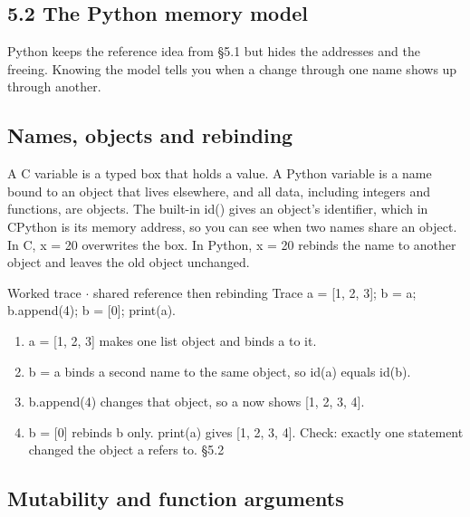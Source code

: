 \documentclass[11pt]{article}
\begin{document}
\begin{keepsection}
\section{5.2 The Python memory model}

Python keeps the reference idea from §5.1 but hides the addresses and the freeing. Knowing the model tells you when a change through one name shows up through another.

\begin{keepsection}
\subsection{Names, objects and rebinding}

A C variable is a typed box that holds a value. A Python variable is a name bound to an object that lives elsewhere, and all data, including integers and functions, are objects. The built-in id() gives an object’s identifier, which in CPython is its memory address, so you can see when two names share an object. In C, x = 20 overwrites the box. In Python, x = 20 rebinds the name to another object and leaves the old object unchanged.

\begin{workedbox}{Worked trace \ensuremath{\cdot} shared reference then rebinding}
Trace a = [1, 2, 3]; b = a; b.append(4); b = [0]; print(a).

\begin{enumerate}
\item a = [1, 2, 3] makes one list object and binds a to it.
\item b = a binds a second name to the same object, so id(a) equals id(b).
\item b.append(4) changes that object, so a now shows [1, 2, 3, 4].
\item b = [0] rebinds b only. print(a) gives [1, 2, 3, 4]. Check: exactly one statement changed the object a refers to. \hfill{\small\color{FAUblue}§5.2}
\end{enumerate}
\end{workedbox}
\end{keepsection}

\begin{keepsection}
\subsection{Mutability and function arguments}


\end{keepsection}
\end{keepsection}
\end{document}
